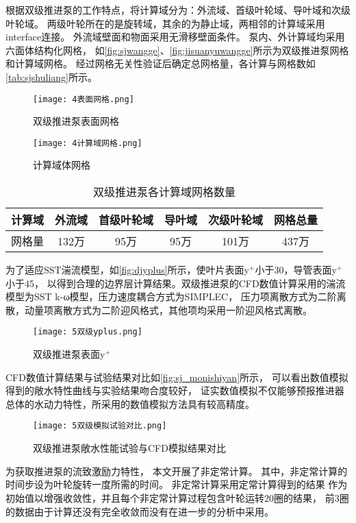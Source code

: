 根据双级推进泵的工作特点，将计算域分为：外流域、首级叶轮域、导叶域和次级叶轮域。
两级叶轮所在的是旋转域，其余的为静止域，两相邻的计算域采用interface连接。
外流域壁面和物面采用无滑移壁面条件。
泵内、外计算域均采用六面体结构化网格，
如\autoref{fig:sjwangge}、\autoref{fig:jisuanyuwangge}所示为双级推进泵网格和计算域网格。
经过网格无关性验证后确定总网格量，各计算与网格数如\autoref{tab:sjshuliang}所示。
\begin{figure}[htbp]
    \centering
    \texttt{[image: 4表面网格.png]}
    \caption{\label{fig:sjwangge}双级推进泵表面网格}
\end{figure}
\begin{figure}[htbp]
    \centering
    \texttt{[image: 4计算域网格.png]}
    \caption{\label{fig:jisuanyuwangge}计算域体网格}
\end{figure}
\begin{table}[htbp]
    \centering
    \caption{\label{tab:sjshuliang}双级推进泵各计算域网格数量}
    \begin{tabular}{cccccc}
        \toprule
        计算域 & 外流域 & 首级叶轮域 & 导叶域 & 次级叶轮域 & 网格总量 \\
        \midrule
        网格量 & 132万 & 95万 & 95万 & 101万 & 437万 \\
        \bottomrule
    \end{tabular}
\end{table}

为了适应SST湍流模型，如\autoref{fig:djyplus}所示，使叶片表面y$^+$小于30，导管表面y$^+$小于45，
以得到合理的边界层计算结果。双级推进泵的CFD数值计算采用的湍流模型为SST k-ω模型，压力速度耦合方式为SIMPLEC，
压力项离散方式为二阶离散，动量项离散方式为二阶迎风格式，其他项均采用一阶迎风格式离散。
\begin{figure}[htbp]
    \centering
    \texttt{[image: 5双级yplus.png]}
    \caption{\label{fig:djyplus}双级推进泵表面y$^+$}
\end{figure}

CFD数值计算结果与试验结果对比如\autoref{fig:sj_monishiyan}所示，
可以看出数值模拟得到的敞水特性曲线与实验结果吻合度较好，
证实数值模拟不仅能够预报推进器总体的水动力特性，所采用的数值模拟方法具有较高精度。
\begin{figure}[htbp]
    \centering
    \texttt{[image: 5双级模拟试验对比.png]}
    \caption{\label{fig:sj_monishiyan}双级推进泵敞水性能试验与CFD模拟结果对比}
\end{figure}

为获取推进泵的流致激励力特性，
本文开展了非定常计算。
其中，非定常计算的时间步设为叶轮旋转一度所需的时间。
非定常计算采用定常计算得到的结果
作为初始值以增强收敛性，并且每个非定常计算过程包含叶轮运转20圈的结果，
前3圈的数据由于计算还没有完全收敛而没有在进一步的分析中采用。
